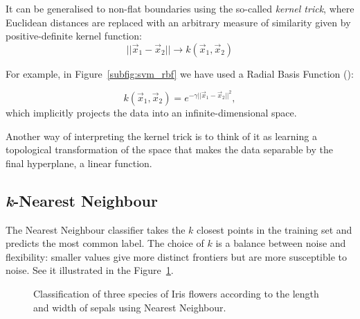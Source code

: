 It can be generalised to non-flat boundaries using the so-called \emph{kernel trick},
where Euclidean distances 
are replaced with an arbitrary measure of similarity given by positive-definite kernel function:
\[||\vec{x}_1 - \vec{x}_2|| \rightarrow k(\vec{x}_1, \vec{x}_2)\]

For example, in Figure~\ref{subfig:svm_rbf} we have used a Radial Basis Function (\RBF):

\[k(\vec{x}_1, \vec{x}_2) = e^{-\gamma ||\vec{x}_1 - \vec{x}_2||^2 },\]
which implicitly projects the data into an infinite-dimensional space.

Another way of interpreting the kernel trick is to think of it as learning a topological transformation of the space that makes the data separable by the final hyperplane, a linear function.

\subsection{\emph{k}-Nearest Neighbour}
The Nearest Neighbour classifier takes the $k$ closest points in the training set and predicts the most common label.
The choice of $k$ is a balance between noise and flexibility: smaller values give more distinct frontiers but are more susceptible to noise.
See it illustrated in the Figure~\ref{fig:knn}.

\begin{figure}[htb]
	\centering
	\hfil
	\caption{Classification of three species of Iris flowers according to the length and width of sepals using Nearest Neighbour.}\label{fig:knn}
\end{figure}

